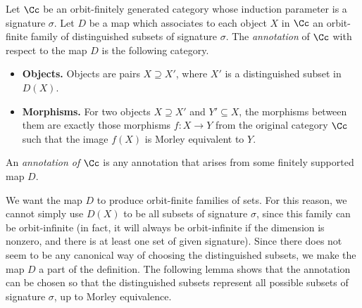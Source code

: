 \begin{definition}[Annotation] 
            Let $\Cc$ be an orbit-finitely generated category whose induction parameter is a signature $\sigma$. Let $D$ be a map which associates to each object $X$ in $\Cc$ an orbit-finite family of distinguished  subsets of signature $\sigma$.
            The \emph{annotation} of $\Cc$ with respect to the map $D$ is the following category.
    \begin{itemize}
    \item \textbf{Objects.} Objects are pairs $X \supseteq X'$, where $X'$ is a distinguished subset in $D(X)$.
    \item \textbf{Morphisms.} For two objects  $X \supseteq X'$ and $Y' \subseteq X$, the morphisms between them  are exactly those morphisms $f : X \to Y$ from the original category $\Cc$ such that 
    the image $f(X)$ is Morley equivalent to $Y$.
\end{itemize}
An \emph{annotation of $\Cc$} is any annotation that arises from some finitely supported map $D$.
 \end{definition}

 We want the map $D$ to produce orbit-finite families of sets. For this reason, we cannot simply use $D(X)$ to be all subsets of signature $\sigma$, since this family can be orbit-infinite (in fact, it will always be orbit-infinite if the dimension is nonzero, and there is at least one set of given signature). Since there does not seem to be any canonical way of choosing the distinguished subsets, we make the map $D$ a part of the definition.  The following lemma shows that the annotation can be chosen so that the distinguished subsets represent all possible subsets of signature $\sigma$, up to Morley equivalence.

